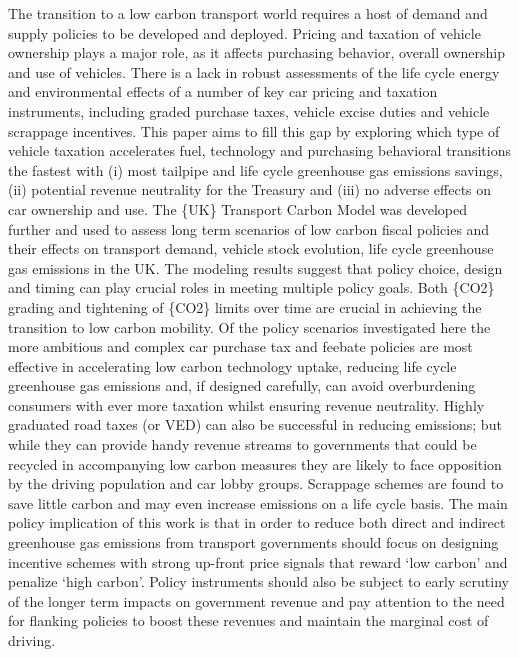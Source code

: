The transition to a low carbon transport world requires a host of demand and supply policies to be developed and deployed. Pricing and taxation of vehicle ownership plays a major role, as it affects purchasing behavior, overall ownership and use of vehicles. There is a lack in robust assessments of the life cycle energy and environmental effects of a number of key car pricing and taxation instruments, including graded purchase taxes, vehicle excise duties and vehicle scrappage incentives. This paper aims to fill this gap by exploring which type of vehicle taxation accelerates fuel, technology and purchasing behavioral transitions the fastest with (i) most tailpipe and life cycle greenhouse gas emissions savings, (ii) potential revenue neutrality for the Treasury and (iii) no adverse effects on car ownership and use. The \{UK\} Transport Carbon Model was developed further and used to assess long term scenarios of low carbon fiscal policies and their effects on transport demand, vehicle stock evolution, life cycle greenhouse gas emissions in the UK. The modeling results suggest that policy choice, design and timing can play crucial roles in meeting multiple policy goals. Both \{CO2\} grading and tightening of \{CO2\} limits over time are crucial in achieving the transition to low carbon mobility. Of the policy scenarios investigated here the more ambitious and complex car purchase tax and feebate policies are most effective in accelerating low carbon technology uptake, reducing life cycle greenhouse gas emissions and, if designed carefully, can avoid overburdening consumers with ever more taxation whilst ensuring revenue neutrality. Highly graduated road taxes (or VED) can also be successful in reducing emissions; but while they can provide handy revenue streams to governments that could be recycled in accompanying low carbon measures they are likely to face opposition by the driving population and car lobby groups. Scrappage schemes are found to save little carbon and may even increase emissions on a life cycle basis. The main policy implication of this work is that in order to reduce both direct and indirect greenhouse gas emissions from transport governments should focus on designing incentive schemes with strong up-front price signals that reward ‘low carbon’ and penalize ‘high carbon’. Policy instruments should also be subject to early scrutiny of the longer term impacts on government revenue and pay attention to the need for flanking policies to boost these revenues and maintain the marginal cost of driving.